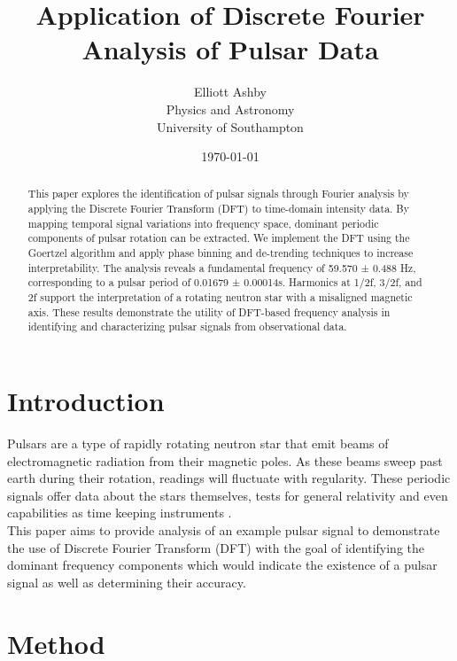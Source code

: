 \documentclass[reqno]{amsart}
\title{Application of Discrete Fourier Analysis of Pulsar Data}
\author[Elliott Ashby]{Elliott Ashby \\ Physics and Astronomy \\ University of Southampton}
\date{\monthyeardate\today}
\numberwithin{equation}{section}
\numberwithin{figure}{section}
\begin{document}
\begin{abstract}
This paper explores the identification of pulsar signals through Fourier analysis by applying the Discrete Fourier Transform (DFT) to time-domain intensity data. By mapping temporal signal variations into frequency space, dominant periodic components of pulsar rotation can be extracted. We implement the DFT using the Goertzel algorithm and apply phase binning and de-trending techniques to increase interpretability. The analysis reveals a fundamental frequency of 59.570 ± 0.488 Hz, corresponding to a pulsar period of 0.01679 ± 0.00014s. Harmonics at 1/2f, 3/2f, and 2f support the interpretation of a rotating neutron star with a misaligned magnetic axis. These results demonstrate the utility of DFT-based frequency analysis in identifying and characterizing pulsar signals from observational data.
\end{abstract}
\maketitle
\tableofcontents
\newpage
\section{Introduction}
Pulsars are a type of rapidly rotating neutron star that emit beams of electromagnetic radiation from their magnetic poles. As these beams sweep past earth during their rotation, readings will fluctuate with regularity. These periodic signals offer data about the stars themselves, tests for general relativity \cite{Taylor1981} and even capabilities as time keeping instruments \cite{Backer1984}. \\

This paper aims to provide analysis of an example pulsar signal to demonstrate the use of Discrete Fourier Transform (DFT) with the goal of identifying the dominant frequency components which would indicate the existence of a pulsar signal as well as determining their accuracy.
\section{Method}
\end{document}
